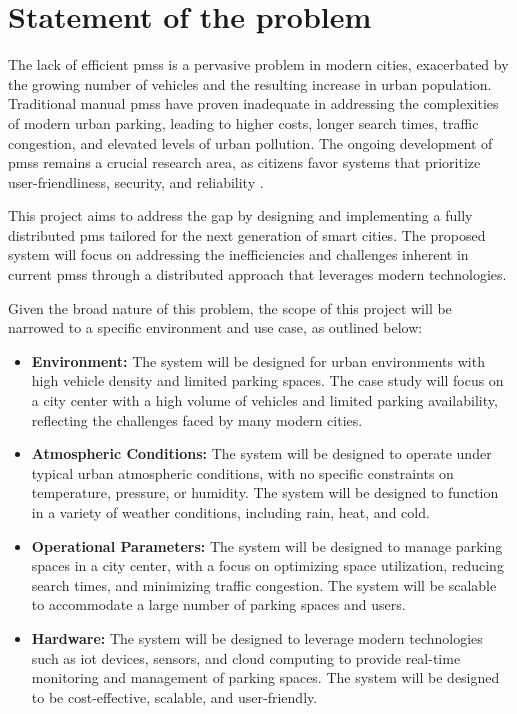 \chapter{Statement of the problem}\label{ch:statement_of_problem}

The lack of efficient \glspl{pms} is a pervasive problem in modern cities, exacerbated by the growing number of vehicles and the resulting increase in urban population. Traditional manual \glspl{pms} have proven inadequate in addressing the complexities of modern urban parking, leading to higher costs, longer search times, traffic congestion, and elevated levels of urban pollution. The ongoing development of \glspl{pms} remains a crucial research area, as citizens favor systems that prioritize user-friendliness, security, and reliability \autocite{parking_choices} \autocite{A_Elsonbaty_2020} \autocite{intelligent_parking_system} \autocite{smart_parking_management_system}.

This project aims to address the gap by designing and implementing a fully distributed \gls{pms} tailored for the next generation of smart cities. The proposed system will focus on addressing the inefficiencies and challenges inherent in current \glspl{pms} through a distributed approach that leverages modern technologies.

Given the broad nature of this problem, the scope of this project will be narrowed to a specific environment and use case, as outlined below:

\begin{itemize}
    \item \textbf{Environment:} The system will be designed for urban environments with high vehicle density and limited parking spaces. The case study will focus on a city center with a high volume of vehicles and limited parking availability, reflecting the challenges faced by many modern cities.

    \item \textbf{Atmospheric Conditions:} The system will be designed to operate under typical urban atmospheric conditions, with no specific constraints on temperature, pressure, or humidity. The system will be designed to function in a variety of weather conditions, including rain, heat, and cold.

    \item \textbf{Operational Parameters:} The system will be designed to manage parking spaces in a city center, with a focus on optimizing space utilization, reducing search times, and minimizing traffic congestion. The system will be scalable to accommodate a large number of parking spaces and users.

    \item \textbf{Hardware:} The system will be designed to leverage modern technologies such as \gls{iot} devices, sensors, and cloud computing to provide real-time monitoring and management of parking spaces. The system will be designed to be cost-effective, scalable, and user-friendly.
\end{itemize}

